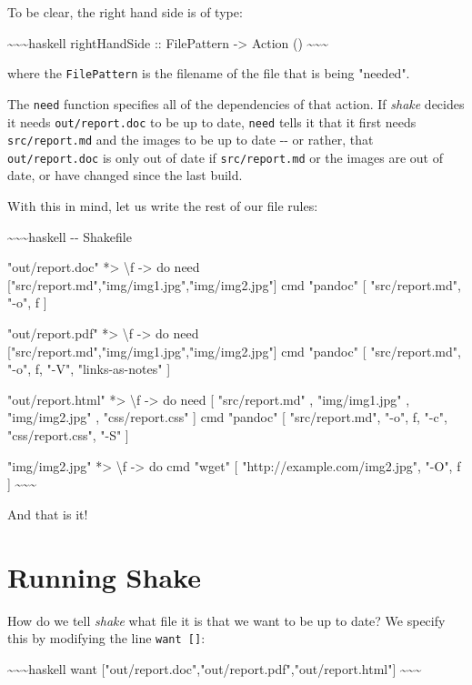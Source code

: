 \documentclass[]{article}
\begin{document}
To be clear, the right hand side is of type:

\textasciitilde{}\textasciitilde{}\textasciitilde{}haskell rightHandSide ::
FilePattern -\textgreater{} Action ()
\textasciitilde{}\textasciitilde{}\textasciitilde{}

where the \texttt{FilePattern} is the filename of the file that is being
"needed".

The \texttt{need} function specifies all of the dependencies of that action. If
\emph{shake} decides it needs \texttt{out/report.doc} to be up to date,
\texttt{need} tells it that it first needs \texttt{src/report.md} and the images
to be up to date -\/- or rather, that \texttt{out/report.doc} is only out of
date if \texttt{src/report.md} or the images are out of date, or have changed
since the last build.

With this in mind, let us write the rest of our file rules:

\textasciitilde{}\textasciitilde{}\textasciitilde{}haskell -\/- Shakefile

"out/report.doc" *\textgreater{} \textbackslash{}f -\textgreater{} do need
{[}"src/report.md","img/img1.jpg","img/img2.jpg"{]} cmd "pandoc" {[}
"src/report.md", "-o", f {]}

"out/report.pdf" *\textgreater{} \textbackslash{}f -\textgreater{} do need
{[}"src/report.md","img/img1.jpg","img/img2.jpg"{]} cmd "pandoc" {[}
"src/report.md", "-o", f, "-V", "links-as-notes" {]}

"out/report.html" *\textgreater{} \textbackslash{}f -\textgreater{} do need {[}
"src/report.md" , "img/img1.jpg" , "img/img2.jpg" , "css/report.css" {]} cmd
"pandoc" {[} "src/report.md", "-o", f, "-c", "css/report.css", "-S" {]}

"img/img2.jpg" *\textgreater{} \textbackslash{}f -\textgreater{} do cmd "wget"
{[} "http://example.com/img2.jpg", "-O", f {]}
\textasciitilde{}\textasciitilde{}\textasciitilde{}

And that is it!

\section{Running Shake}

How do we tell \emph{shake} what file it is that we want to be up to date? We
specify this by modifying the line \texttt{want\ {[}{]}}:

\textasciitilde{}\textasciitilde{}\textasciitilde{}haskell want
{[}"out/report.doc","out/report.pdf","out/report.html"{]}
\textasciitilde{}\textasciitilde{}\textasciitilde{}
\end{document}
